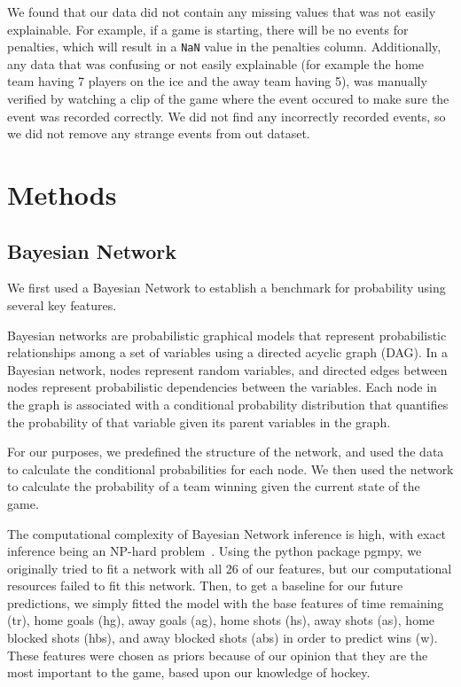 \documentclass[11pt]{article}
\begin{document}
We found that our data did not contain any missing values that was not easily explainable. For example, if a game is starting, there will be no
events for penalties, which will result in a {\tt NaN} value in the penalties column. Additionally, any data that was confusing or not easily explainable
(for example the home team having 7 players on the ice and the away team having 5), was manually verified by watching a clip of the game where
the event occured to make sure the event was recorded correctly. We did not find any incorrectly recorded events, so we 
did not remove any strange events from out dataset.

\section{Methods}

\subsection{Bayesian Network}
We first used a Bayesian Network to establish a benchmark for probability using several key features.

Bayesian networks are probabilistic graphical models that represent probabilistic relationships among a set of variables using a directed acyclic graph (DAG). 
In a Bayesian network, nodes represent random variables, and directed edges between nodes represent probabilistic dependencies between the variables. Each node in the graph is associated with a conditional probability distribution that quantifies the probability of that variable given its parent variables in the graph.

For our purposes, we predefined the structure of the network, and used the data to calculate the conditional probabilities for each node. We then used the network to calculate the probability of a team winning given the current state of the game.

The computational complexity of Bayesian Network inference is high, with exact inference being an NP-hard problem~\cite{pmlr-vR0-chickering95a}. 
Using the python package pgmpy, we originally tried to fit a network with all 26 of our features, but our computational resources failed to fit this network.
Then, to get a baseline for our future predictions, we simply fitted the model with the base features of time remaining (tr), home goals (hg), away goals (ag), home shots (hs), away shots (as), home blocked shots (hbs), and away blocked shots (abs) in order to predict wins (w). 
These features were chosen as priors because of our opinion that they are the most important to the game, based upon our knowledge of hockey.
\end{document}
